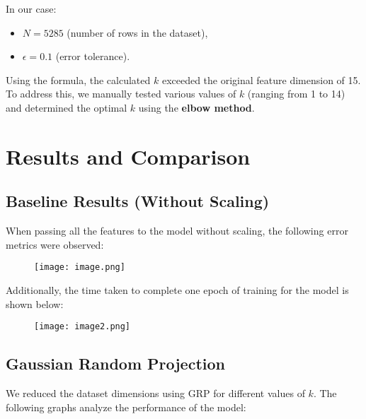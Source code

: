 \documentclass[conference]{IEEEtran}
\begin{document}
In our case:
\begin{itemize}
    \item \(N = 5285\) (number of rows in the dataset),
    \item \(\epsilon = 0.1\) (error tolerance).
\end{itemize}

Using the formula, the calculated \(k\) exceeded the original feature dimension of 15. To address this, we manually tested various values of \(k\) (ranging from 1 to 14) and determined the optimal \(k\) using the \textbf{elbow method}.

\section{Results and Comparison}

\subsection{Baseline Results (Without Scaling)}
When passing all the features to the model without scaling, the following error metrics were observed:
\vspace{-0.3cm}
\begin{figure}[H]
\centering
\texttt{[image: image.png]}
\label{fig:train_val_losses}
\end{figure}
\vspace{-0.3cm}
Additionally, the time taken to complete one epoch of training for the model is shown below:
\vspace{-0.3cm}
\begin{figure}[H]
\centering
\texttt{[image: image2.png]}
\label{fig:runtime_linear}
\end{figure}
\vspace{-0.3cm}
\subsection{Gaussian Random Projection}
We reduced the dataset dimensions using GRP for different values of \(k\). The following graphs analyze the performance of the model:
\end{document}
